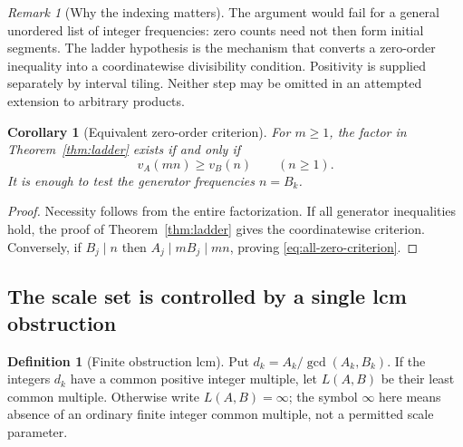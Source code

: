\documentclass[11pt,a4paper]{article}
\newtheorem{corollary}[theorem]{Corollary}
\theoremstyle{definition}
\newtheorem{definition}[theorem]{Definition}
\theoremstyle{remark}
\newtheorem{remark}[theorem]{Remark}
\begin{document}
\begin{remark}[Why the indexing matters]
The argument would fail for a general unordered list of integer
frequencies: zero counts need not then form initial segments. The ladder
hypothesis is the mechanism that converts a zero-order inequality into a
coordinatewise divisibility condition. Positivity is supplied separately
by interval tiling. Neither step may be omitted in an attempted
extension to arbitrary products.
\end{remark}

\begin{corollary}[Equivalent zero-order criterion]\label{cor:zero-criterion}
For $m\ge1$, the factor in Theorem~\ref{thm:ladder} exists if and only if
\begin{equation}\label{eq:all-zero-criterion}
 v_A(mn)\ge v_B(n)\qquad(n\ge1).
\end{equation}
It is enough to test the generator frequencies $n=B_k$.
\end{corollary}
\begin{proof}
Necessity follows from the entire factorization. If all generator
inequalities hold, the proof of Theorem~\ref{thm:ladder} gives the
coordinatewise criterion. Conversely, if $B_j\mid n$ then
$A_j\mid mB_j\mid mn$, proving \eqref{eq:all-zero-criterion}.
\end{proof}

\subsection{The scale set is controlled by a single lcm obstruction}
\begin{definition}[Finite obstruction lcm]
Put $d_k=A_k/\gcd(A_k,B_k)$. If the integers $d_k$ have a common positive
integer multiple, let $L(A,B)$ be their least common multiple. Otherwise
write $L(A,B)=\infty$; the symbol $\infty$ here means absence of an ordinary
finite integer common multiple, not a permitted scale parameter.
\end{definition}
\end{document}

